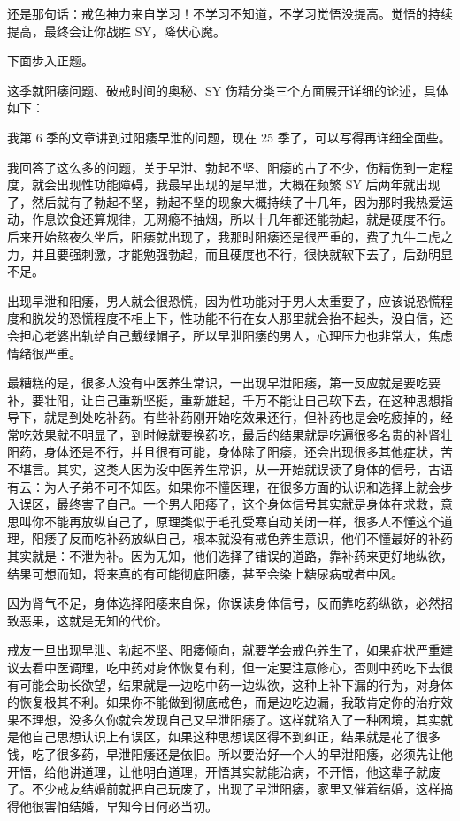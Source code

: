 \documentclass[fontset=founder]{ctexart}
\begin{document}
还是那句话：戒色神力来自学习！不学习不知道，不学习觉悟没提高。觉悟的持续提高，最终会让你战胜 SY，降伏心魔。

下面步入正题。

这季就阳痿问题、破戒时间的奥秘、SY 伤精分类三个方面展开详细的论述，具体如下：

我第 6 季的文章讲到过阳痿早泄的问题，现在 25 季了，可以写得再详细全面些。

我回答了这么多的问题，关于早泄、勃起不坚、阳痿的占了不少，伤精伤到一定程度，就会出现性功能障碍，我最早出现的是早泄，大概在频繁 SY 后两年就出现了，然后就有了勃起不坚，勃起不坚的现象大概持续了十几年，因为那时我热爱运动，作息饮食还算规律，无网瘾不抽烟，所以十几年都还能勃起，就是硬度不行。后来开始熬夜久坐后，阳痿就出现了，我那时阳痿还是很严重的，费了九牛二虎之力，并且要强刺激，才能勉强勃起，而且硬度也不行，很快就软下去了，后劲明显不足。

出现早泄和阳痿，男人就会很恐慌，因为性功能对于男人太重要了，应该说恐慌程度和脱发的恐慌程度不相上下，性功能不行在女人那里就会抬不起头，没自信，还会担心老婆出轨给自己戴绿帽子，所以早泄阳痿的男人，心理压力也非常大，焦虑情绪很严重。

最糟糕的是，很多人没有中医养生常识，一出现早泄阳痿，第一反应就是要吃要补，要壮阳，让自己重新坚挺，重新雄起，千万不能让自己软下去，在这种思想指导下，就是到处吃补药。有些补药刚开始吃效果还行，但补药也是会吃疲掉的，经常吃效果就不明显了，到时候就要换药吃，最后的结果就是吃遍很多名贵的补肾壮阳药，身体还是不行，并且很有可能，身体除了阳痿，还会出现很多其他症状，苦不堪言。其实，这类人因为没中医养生常识，从一开始就误读了身体的信号，古语有云：为人子弟不可不知医。如果你不懂医理，在很多方面的认识和选择上就会步入误区，最终害了自己。一个男人阳痿了，这个身体信号其实就是身体在求救，意思叫你不能再放纵自己了，原理类似于毛孔受寒自动关闭一样，很多人不懂这个道理，阳痿了反而吃补药放纵自己，根本就没有戒色养生意识，他们不懂最好的补药其实就是：不泄为补。因为无知，他们选择了错误的道路，靠补药来更好地纵欲，结果可想而知，将来真的有可能彻底阳痿，甚至会染上糖尿病或者中风。

因为肾气不足，身体选择阳痿来自保，你误读身体信号，反而靠吃药纵欲，必然招致恶果，这就是无知的代价。

戒友一旦出现早泄、勃起不坚、阳痿倾向，就要学会戒色养生了，如果症状严重建议去看中医调理，吃中药对身体恢复有利，但一定要注意修心，否则中药吃下去很有可能会助长欲望，结果就是一边吃中药一边纵欲，这种上补下漏的行为，对身体的恢复极其不利。如果你不能做到彻底戒色，而是边吃边漏，我敢肯定你的治疗效果不理想，没多久你就会发现自己又早泄阳痿了。这样就陷入了一种困境，其实就是他自己思想认识上有误区，如果这种思想误区得不到纠正，结果就是花了很多钱，吃了很多药，早泄阳痿还是依旧。所以要治好一个人的早泄阳痿，必须先让他开悟，给他讲道理，让他明白道理，开悟其实就能治病，不开悟，他这辈子就废了。不少戒友结婚前就把自己玩废了，出现了早泄阳痿，家里又催着结婚，这样搞得他很害怕结婚，早知今日何必当初。
\end{document}
